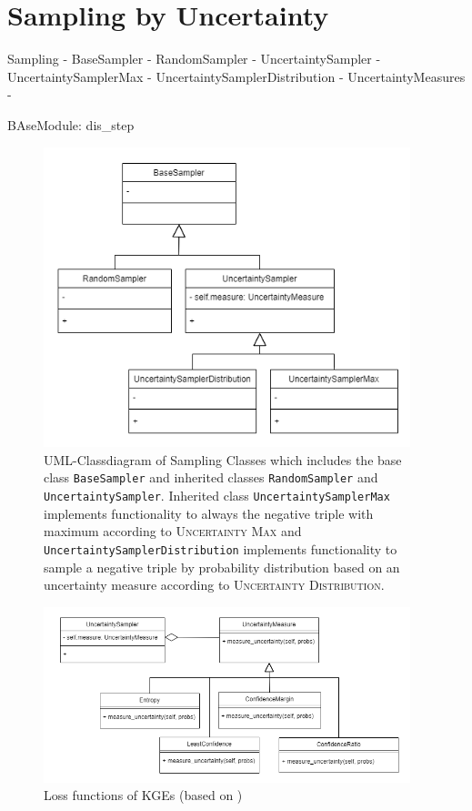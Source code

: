 \section{Sampling by Uncertainty}
 \label{sec:sampling_by_uncertainty}
 
 
 
Sampling
- BaseSampler
- RandomSampler
- UncertaintySampler
    - UncertaintySamplerMax
    - UncertaintySamplerDistribution
- UncertaintyMeasures
    - 

BAseModule: dis\_step



\begin{figure}[t]
  \centering
    \includegraphics[width=0.95\textwidth]{figures/classdiagrams/SamplingClasses.png}
  \caption{\ac{UML}-Classdiagram of Sampling Classes which includes the base class \texttt{BaseSampler} and inherited classes \texttt{RandomSampler} and \texttt{UncertaintySampler}.
  Inherited class \texttt{UncertaintySamplerMax} implements functionality to always the negative triple with maximum according to \textsc{Uncertainty Max} and \texttt{UncertaintySamplerDistribution} implements functionality to sample a negative triple by probability distribution based on an uncertainty measure according to \textsc{Uncertainty Distribution}.}
  \label{fig:sampling_classdiagramm}
\end{figure}


\begin{figure}[t]
  \centering
    \includegraphics[width=0.95\textwidth]{figures/classdiagrams/UncertaintyMeasures.png}
  \caption{Loss functions of \acp{KGE} (based on \cite{9207513})}
  \label{fig:uncertainty_measures}
\end{figure}
